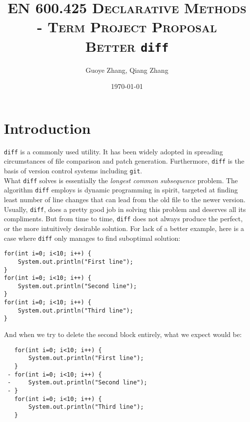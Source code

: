 \documentclass{article}
\begin{document}
\title{\textsc{EN 600.425 Declarative Methods \\ - Term Project Proposal}\\ \textbf{\textsc{Better } \texttt{diff}}} %
\author{Guoye Zhang, Qiang Zhang\\
        }  %
\date{\today}  %
\maketitle

\section{Introduction}
\texttt{diff} is a commonly used utility. It has been widely adopted in spreading circumstances of file comparison and patch generation. Furthermore, \texttt{diff} is the basis of version control systems including \texttt{git}.\\

What \texttt{diff} solves is essentially the \textit{longest common subsequence} problem. The algorithm \texttt{diff} employs is dynamic programming in spirit, targeted at finding least number of line changes that can lead from the old file to the newer version. Usually, \texttt{diff}, does a pretty good job in solving this problem and deserves all its compliments. But from time to time, \texttt{diff} does not always produce the perfect, or the more intuitively desirable solution. For lack of a better example, here is a case where \texttt{diff} only manages to find suboptimal solution:\\
\begin{lstlisting}
for(int i=0; i<10; i++) {
    System.out.println("First line");
}
for(int i=0; i<10; i++) {
    System.out.println("Second line");
}
for(int i=0; i<10; i++) {
    System.out.println("Third line");
}
\end{lstlisting}

And when we try to delete the second block entirely, what we expect would be:
\begin{lstlisting}
   for(int i=0; i<10; i++) {
       System.out.println("First line");
   }
 - for(int i=0; i<10; i++) {
 -     System.out.println("Second line");
 - }
   for(int i=0; i<10; i++) {
       System.out.println("Third line");
   }
\end{lstlisting}
\end{document}
